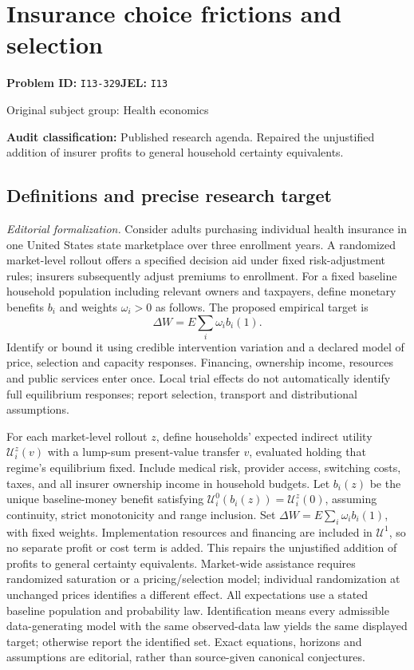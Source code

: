\documentclass[11pt,a4paper]{article}
\begin{document}
\section*{Insurance choice frictions and selection}
\textbf{Problem ID:} \texttt{I13-329}\quad \textbf{JEL:} \texttt{I13}\par
\label{problem:OP-0442}
{\sffamily\small\color{muted}Original subject group: Health economics\par}
\label{definitions:problem:30007724}
\textbf{Audit classification:} Published research agenda. Repaired the unjustified addition of insurer profits to general household certainty equivalents.
\subsection*{Definitions and precise research target}
\textit{Editorial formalization.} Consider adults purchasing individual health insurance in one United States state marketplace over three enrollment years. A randomized market-level rollout offers a specified decision aid under fixed risk-adjustment rules; insurers subsequently adjust premiums to enrollment. For a fixed baseline household population including relevant owners and taxpayers, define monetary benefits \(b_i\) and weights \(\omega_i>0\) as follows. The proposed empirical target is \[\Delta W=E\sum_i\omega_i b_i(1).\] Identify or bound it using credible intervention variation and a declared model of price, selection and capacity responses. Financing, ownership income, resources and public services enter once. Local trial effects do not automatically identify full equilibrium responses; report selection, transport and distributional assumptions.

For each market-level rollout \(z\), define households' expected indirect utility \(\mathcal U_i^z(v)\) with a lump-sum present-value transfer \(v\), evaluated holding that regime's equilibrium fixed. Include medical risk, provider access, switching costs, taxes, and all insurer ownership income in household budgets. Let \(b_i(z)\) be the unique baseline-money benefit satisfying \(\mathcal U_i^0(b_i(z))=\mathcal U_i^z(0)\), assuming continuity, strict monotonicity and range inclusion. Set \(\Delta W=E\sum_i\omega_i b_i(1)\), with fixed weights. Implementation resources and financing are included in \(\mathcal U^1\), so no separate profit or cost term is added. This repairs the unjustified addition of profits to general certainty equivalents. Market-wide assistance requires randomized saturation or a pricing/selection model; individual randomization at unchanged prices identifies a different effect. All expectations use a stated baseline population and probability law. Identification means every admissible data-generating model with the same observed-data law yields the same displayed target; otherwise report the identified set. Exact equations, horizons and assumptions are editorial, rather than source-given canonical conjectures.
\end{document}
